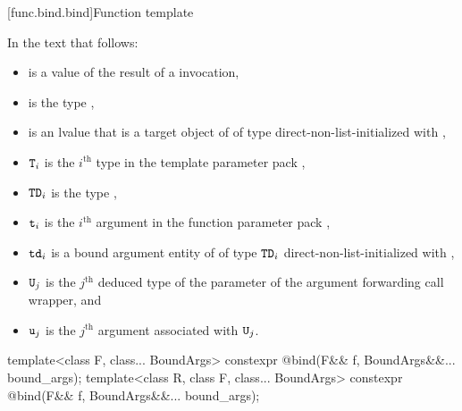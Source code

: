 [func.bind.bind]{Function template }

\pnum
In the text that follows:
\begin{itemize}
\item {} is a value of the result of a  invocation,
\item {} is the type ,
\item {} is an lvalue that
  is a target object of  of type 
  direct-non-list-initialized with ,
\item $\texttt{T}_i$ is the $i^\text{th}$ type in the template parameter pack ,
\item $\texttt{TD}_i$ is the type ,
\item $\texttt{t}_i$ is the $i^\text{th}$ argument in the function parameter pack ,
\item $\texttt{td}_i$ is a bound argument entity
  of  of type $\texttt{TD}_i$
  direct-non-list-initialized with
  ,
\item $\texttt{U}_j$ is the $j^\text{th}$ deduced type of the  parameter
  of the argument forwarding call wrapper, and
\item $\texttt{u}_j$ is the $j^\text{th}$ argument associated with $\texttt{U}_j$.
\end{itemize}

%
\begin{itemdecl}
template<class F, class... BoundArgs>
  constexpr @\unspec@ bind(F&& f, BoundArgs&&... bound_args);
template<class R, class F, class... BoundArgs>
  constexpr @\unspec@ bind(F&& f, BoundArgs&&... bound_args);
\end{itemdecl}

